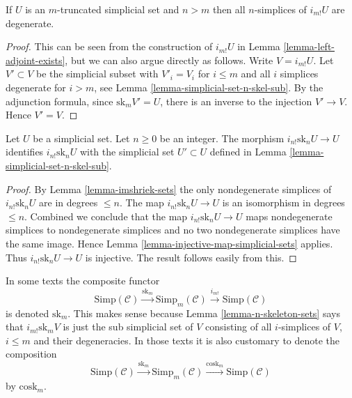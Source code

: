 \begin{lemma}
\label{lemma-imshriek-sets}
If $U$ is an $m$-truncated simplicial set and $n > m$
then all $n$-simplices of $i_{m!}U$ are degenerate.
\end{lemma}

\begin{proof}
This can be seen from the construction of
$i_{m!}U$ in Lemma \ref{lemma-left-adjoint-exists},
but we can also argue directly as follows.
Write $V = i_{m!}U$. Let $V' \subset V$ be the
simplicial subset with $V'_i = V_i$ for $i \leq m$
and all $i$ simplices degenerate for $i > m$,
see Lemma \ref{lemma-simplicial-set-n-skel-sub}.
By the adjunction formula,
since $\text{sk}_m V' = U$, there is an inverse to the
injection $V' \to V$. Hence $V' = V$.
\end{proof}

\begin{lemma}
\label{lemma-n-skeleton-sets}
Let $U$ be a simplicial set.
Let $n \geq 0$ be an integer.
The morphism $i_{n!} \text{sk}_n U \to U$ identifies
$i_{n!} \text{sk}_n U$ with the simplicial set
$U' \subset U$ defined in Lemma \ref{lemma-simplicial-set-n-skel-sub}.
\end{lemma}

\begin{proof}
By Lemma \ref{lemma-imshriek-sets} the only
nondegenerate simplices of $i_{n!} \text{sk}_n U$
are in degrees $\leq n$. The map
$i_{n!} \text{sk}_n U \to U$ is an isomorphism
in degrees $\leq n$. Combined we conclude
that the map $i_{n!} \text{sk}_n U \to U$ maps
nondegenerate simplices to nondegenerate simplices
and no two nondegenerate simplices have the same image.
Hence Lemma \ref{lemma-injective-map-simplicial-sets} applies.
Thus $i_{n!} \text{sk}_n U \to U$
is injective. The result follows easily from this.
\end{proof}

\begin{remark}
\label{remark-sk-literature}
In some texts the composite functor
$$
\text{Simp}(\mathcal{C})
\xrightarrow{\text{sk}_m}
\text{Simp}_m(\mathcal{C})
\xrightarrow{i_{m!}}
\text{Simp}(\mathcal{C})
$$
is denoted $\text{sk}_m$. This makes sense because
Lemma \ref{lemma-n-skeleton-sets} says
that $i_{m!} \text{sk}_m V$ is just the sub simplicial set
of $V$ consisting of all $i$-simplices of $V$, $i \leq m$
and their degeneracies. In those texts it is also customary
to denote the composition
$$
\text{Simp}(\mathcal{C})
\xrightarrow{\text{sk}_m}
\text{Simp}_m(\mathcal{C})
\xrightarrow{\text{cosk}_m}
\text{Simp}(\mathcal{C})
$$
by $\text{cosk}_m$.
\end{remark}

